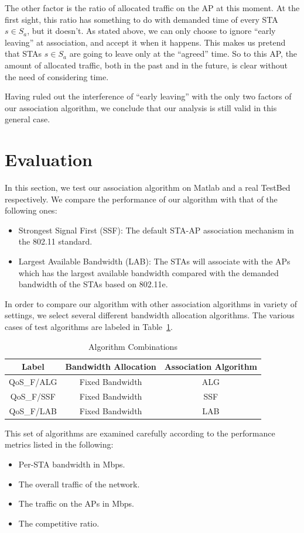 \documentclass[conference]{IEEEtran}
\begin{document}
  The other factor is the ratio of allocated traffic on the AP at this moment. At the first sight, this ratio has something to do with demanded time of every STA $s\in S_a$, but it doesn't. As stated above, we can only choose to ignore ``early leaving'' at association, and accept it when it happens. This makes us pretend that STAs $s\in S_a$ are going to leave only at the ``agreed'' time. So to this AP, the amount of allocated traffic, both in the past and in the future, is clear without the need of considering time.

  Having ruled out the interference of ``early leaving'' with the only two factors of our association algorithm, we conclude that our analysis is still valid in this general case.

  \section{Evaluation}\label{sec:evaluation}
  In this section, we test our association algorithm on Matlab\cite{MATLAB} and a real TestBed respectively.  We compare the performance of our algorithm with that of the following ones:
  \begin{itemize}
    \item Strongest Signal First (SSF): The default STA-AP association mechanism in the 802.11 standard.
    \item Largest Available Bandwidth (LAB): The STAs will associate with the APs which has the largest available bandwidth compared with the demanded bandwidth of the STAs based on 802.11e.
  \end{itemize}

  In order to compare our algorithm with other association algorithms in variety of settings, we select several different bandwidth allocation algorithms. The various cases of test algorithms are labeled in Table~\ref{tl:algorithm_combinations}.

  \begin{table}[!ht]
  \centering
  \caption{Algorithm Combinations}\label{tl:algorithm_combinations}
  \begin{tabular}{|c|c|c|}
    \hline
    Label & Bandwidth Allocation & Association Algorithm \\
    \hline
    QoS\_F/ALG & Fixed Bandwidth & ALG\\
    \hline
    QoS\_F/SSF & Fixed Bandwidth & SSF\\
    \hline
    QoS\_F/LAB & Fixed Bandwidth & LAB\\
    \hline
  \end{tabular}

  \end{table}
  This set of algorithms are examined carefully according to the performance metrics listed in the following:
  \begin{itemize}
    \item Per-STA bandwidth in Mbps.
    \item The overall traffic of the network.
    \item The traffic on the APs in Mbps.
    \item The competitive ratio.
  \end{itemize}
\end{document}
